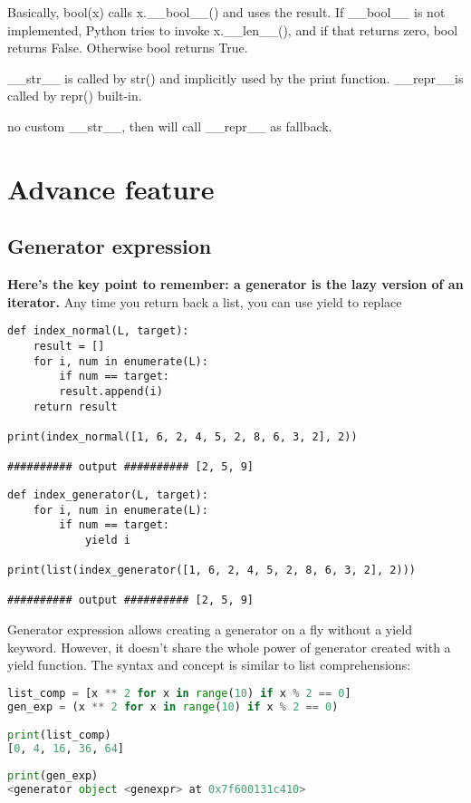 \documentclass[a4paper,12pt,twoside]{book}
\begin{document}
Basically, bool(x) calls x.\_\_bool\_\_() and uses
the result. If \_\_bool\_\_ is not implemented, Python tries to invoke x.\_\_len\_\_(), and
if that returns zero, bool returns False. Otherwise bool returns True.

\_\_str\_\_ is called by str() and implicitly used by the print function. \_\_repr\_\_is called by repr() built-in. 
	
no custom \_\_str\_\_, then will call \_\_repr\_\_ as fallback. 
		
\section{Advance feature}
\subsection{Generator expression}

\textbf{Here’s the key point to remember: a generator is the lazy version of an iterator.} Any time you return back a list, you can use yield to replace

\begin{lstlisting}
def index_normal(L, target):
	result = []
	for i, num in enumerate(L):
		if num == target:
		result.append(i)
	return result

print(index_normal([1, 6, 2, 4, 5, 2, 8, 6, 3, 2], 2))

########## output ########## [2, 5, 9]
\end{lstlisting}

\begin{lstlisting}
def index_generator(L, target):
	for i, num in enumerate(L):
		if num == target:
			yield i

print(list(index_generator([1, 6, 2, 4, 5, 2, 8, 6, 3, 2], 2)))

########## output ########## [2, 5, 9]
\end{lstlisting}


Generator expression allows creating a generator on a fly without a yield keyword. However, it doesn’t share the whole power of generator created with a yield function. The syntax and concept is similar to list comprehensions:

\begin{lstlisting}[frame=single, language=Python]
list_comp = [x ** 2 for x in range(10) if x % 2 == 0]
gen_exp = (x ** 2 for x in range(10) if x % 2 == 0)

print(list_comp)
[0, 4, 16, 36, 64]
	
print(gen_exp)
<generator object <genexpr> at 0x7f600131c410>  
\end{lstlisting}  
	
\end{document}
